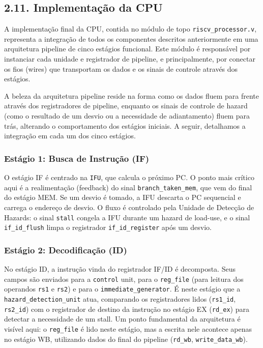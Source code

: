 \documentclass[12pt, a4paper]{article}
\begin{document}
\subsection*{2.11. Implementação da CPU}

A implementação final da CPU, contida no módulo de topo \texttt{riscv\_processor.v}, representa a integração de todos os componentes descritos anteriormente em uma arquitetura pipeline de cinco estágios funcional. Este módulo é responsável por instanciar cada unidade e registrador de pipeline, e principalmente, por conectar os fios (wires) que transportam os dados e os sinais de controle através dos estágios.

A beleza da arquitetura pipeline reside na forma como os dados fluem para frente através dos registradores de pipeline, enquanto os sinais de controle de hazard (como o resultado de um desvio ou a necessidade de adiantamento) fluem para trás, alterando o comportamento dos estágios iniciais. A seguir, detalhamos a integração em cada um dos cinco estágios.

\subsubsection*{Estágio 1: Busca de Instrução (IF)}
O estágio IF é centrado na \texttt{IFU}, que calcula o próximo PC. O ponto mais crítico aqui é a realimentação (feedback) do sinal \texttt{branch\_taken\_mem}, que vem do final do estágio MEM. Se um desvio é tomado, a IFU descarta o PC sequencial e carrega o endereço de desvio. O fluxo é controlado pela Unidade de Detecção de Hazards: o sinal \texttt{stall} congela a IFU durante um hazard de load-use, e o sinal \texttt{if\_id\_flush} limpa o registrador \texttt{if\_id\_register} após um desvio.

\subsubsection*{Estágio 2: Decodificação (ID)}
No estágio ID, a instrução vinda do registrador IF/ID é decomposta. Seus campos são enviados para a \texttt{control} unit, para o \texttt{reg\_file} (para leitura dos operandos \texttt{rs1} e \texttt{rs2}) e para o \texttt{immediate\_generator}. É neste estágio que a \texttt{hazard\_detection\_unit} atua, comparando os registradores lidos (\texttt{rs1\_id}, \texttt{rs2\_id}) com o registrador de destino da instrução no estágio EX (\texttt{rd\_ex}) para detectar a necessidade de um stall. Um ponto fundamental da arquitetura é visível aqui: o \texttt{reg\_file} é lido neste estágio, mas a escrita nele acontece apenas no estágio WB, utilizando dados do final do pipeline (\texttt{rd\_wb}, \texttt{write\_data\_wb}).
\end{document}
